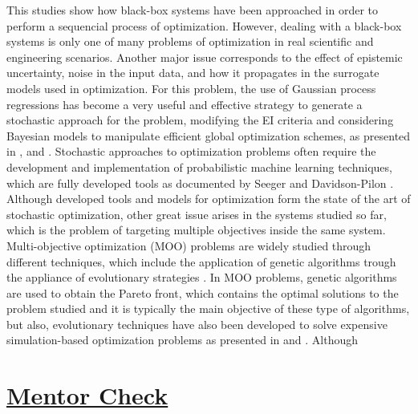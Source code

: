 \documentclass{journal}
\begin{document}
This studies show how black-box systems have been approached in order to perform a sequencial process of optimization. However, dealing with a black-box systems is only one of many problems of optimization in real scientific and engineering scenarios. Another major issue corresponds to the effect of epistemic uncertainty, noise in the input data, and how it propagates in the surrogate models used in optimization. For this problem, the use of Gaussian process regressions has become a very useful and effective strategy to generate a stochastic approach for the problem, modifying the EI criteria and considering Bayesian models to manipulate efficient global optimization schemes, as presented in \cite{Huang2006}, \cite{Pandita2016} and \cite{Li2014}. Stochastic approaches to optimization problems often require the development and implementation of probabilistic machine learning techniques, which are fully developed tools as documented by Seeger \cite{Seeger2004} and Davidson-Pilon \cite{Davidson-Pilon2014}. Although developed tools and models for optimization form the state of the art of stochastic optimization, other great issue arises in the systems studied so far, which is the problem of targeting multiple objectives inside the same system.\\

Multi-objective optimization (MOO) problems are widely studied through different techniques, which include the application of genetic algorithms trough the appliance of evolutionary strategies \cite{Costa2006}. In MOO problems, genetic algorithms are used to obtain the Pareto front, which contains the optimal solutions to the problem studied and it is typically the main objective of these type of algorithms, but also, evolutionary techniques have also been developed to solve expensive simulation-based optimization problems as presented in \cite{Guo2007} and \cite{Huang2009}. Although 

\section{\underline{Mentor Check}}



\end{document}
